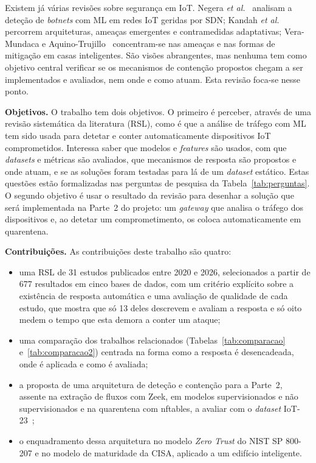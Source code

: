 \documentclass[conference,a4paper]{IEEEtran}
\begin{document}
Existem já várias revisões sobre segurança em IoT. Negera \textit{et al.}~\cite{negera2022review}
analisam a deteção de \textit{botnets} com ML em redes IoT geridas por SDN; Kandah
\textit{et al.}~\cite{kandah2025navigating} percorrem arquiteturas, ameaças emergentes e
contramedidas adaptativas; Vera-Mundaca e Aquino-Trujillo~\cite{veramundaca2024cybersecurity}
concentram-se nas ameaças e nas formas de mitigação em casas inteligentes. São visões
abrangentes, mas nenhuma tem como objetivo central verificar se os mecanismos de
contenção propostos chegam a ser implementados e avaliados, nem onde e como atuam. Esta
revisão foca-se nesse ponto.

\textbf{Objetivos.} O trabalho tem dois objetivos. O primeiro é perceber, através de uma
revisão sistemática da literatura (RSL), como é que a análise de tráfego com ML tem sido
usada para detetar e conter automaticamente dispositivos IoT comprometidos. Interessa
saber que modelos e \textit{features} são usados, com que \textit{datasets} e métricas são
avaliados, que mecanismos de resposta são propostos e onde atuam, e se as soluções foram
testadas para lá de um \textit{dataset} estático. Estas questões estão formalizadas nas
perguntas de pesquisa da Tabela~\ref{tab:perguntas}. O segundo objetivo é usar o
resultado da revisão para desenhar a solução que será implementada na Parte~2 do
projeto: um \textit{gateway} que analisa o tráfego dos dispositivos e, ao detetar um
comprometimento, os coloca automaticamente em quarentena.

\textbf{Contribuições.} As contribuições deste trabalho são quatro:
\begin{itemize}
  \item uma RSL de 31 estudos publicados entre 2020 e 2026, selecionados a
  partir de 677 resultados em cinco bases de dados, com um critério explícito sobre a
  existência de resposta automática e uma avaliação de qualidade de cada estudo, que
  mostra que só 13 deles descrevem e avaliam a resposta e só oito medem o tempo que esta
  demora a conter um ataque;
  \item uma comparação dos trabalhos relacionados (Tabelas~\ref{tab:comparacao}
  e~\ref{tab:comparacao2}) centrada
  na forma como a resposta é desencadeada, onde é aplicada e como é avaliada;
  \item a proposta de uma arquitetura de deteção e contenção para a Parte~2, assente na
  extração de fluxos com Zeek, em modelos supervisionados e não supervisionados e na
  quarentena com nftables, a avaliar com o \textit{dataset} IoT-23~\cite{iot23};
  \item o enquadramento dessa arquitetura no modelo \textit{Zero Trust} do NIST
  SP 800-207 e no modelo de maturidade da CISA, aplicado a um edifício inteligente.
\end{itemize}
\end{document}
